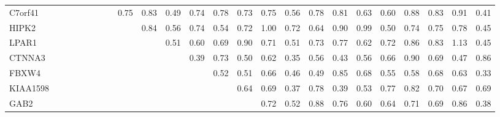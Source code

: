 \begin{longtable}{lrrrrrrrrrrrrrrrrrrrrrrr}
C7orf41  &              &              &            &            &            &             &               &        0.75 &        0.83 &         0.49 &        0.74 &           0.78 &       0.73 &       0.75 &         0.56 &           0.78 &        0.81 &          0.63 &        0.60 &      0.88 &           0.83 &        0.91 &          0.41 \\
HIPK2    &              &              &            &            &            &             &               &             &        0.84 &         0.56 &        0.74 &           0.54 &       0.72 &       1.00 &         0.72 &           0.64 &        0.90 &          0.99 &        0.50 &      0.74 &           0.75 &        0.78 &          0.45 \\
LPAR1    &              &              &            &            &            &             &               &             &             &         0.51 &        0.60 &           0.69 &       0.90 &       0.71 &         0.51 &           0.73 &        0.77 &          0.62 &        0.72 &      0.86 &           0.83 &        1.13 &          0.45 \\
CTNNA3   &              &              &            &            &            &             &               &             &             &              &        0.39 &           0.73 &       0.50 &       0.62 &         0.35 &           0.56 &        0.43 &          0.56 &        0.66 &      0.90 &           0.69 &        0.47 &          0.86 \\
FBXW4    &              &              &            &            &            &             &               &             &             &              &             &           0.52 &       0.51 &       0.66 &         0.46 &           0.49 &        0.85 &          0.68 &        0.55 &      0.58 &           0.68 &        0.63 &          0.33 \\
KIAA1598 &              &              &            &            &            &             &               &             &             &              &             &                &       0.64 &       0.69 &         0.37 &           0.78 &        0.39 &          0.53 &        0.77 &      0.82 &           0.70 &        0.67 &          0.69 \\
GAB2     &              &              &            &            &            &             &               &             &             &              &             &                &            &       0.72 &         0.52 &           0.88 &        0.76 &          0.60 &        0.64 &      0.71 &           0.69 &        0.86 &          0.38 \\

\end{longtable}
